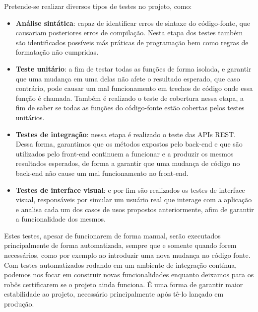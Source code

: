 Pretende-se realizar diversos tipos de testes no projeto, como:
\begin{itemize}
    \item \textbf{Análise sintática}: capaz de identificar erros de sintaxe do código-fonte, que causariam posteriores erros de compilação. Nesta etapa dos testes também são identificados possíveis más práticas de programação bem como regras de formatação não cumpridas.
    \item \textbf{Teste unitário}: a fim de testar todas as funções de forma isolada, e garantir que uma mudança em uma delas não afete o resultado esperado, que caso contrário, pode causar um mal funcionamento em trechos de código onde essa função é chamada. Também é realizado o teste de cobertura nessa etapa, a fim de saber se todas as funções do código-fonte estão cobertas pelos testes unitários.
    \item \textbf{Testes de integração}: nessa etapa é realizado o teste das APIs REST. Dessa forma, garantimos que os métodos expostos pelo back-end e que são utilizados pelo front-end continuem a funcionar e a produzir os mesmos resultados esperados, de forma a garantir que uma mudança de código no back-end não cause um mal funcionamento no front-end.
    \item \textbf{Testes de interface visual}: e por fim são realizados os testes de interface visual, responsáveis por simular um usuário real que interage com a aplicação e analisa cada um dos casos de usos propostos anteriormente, afim de garantir a funcionalidade dos mesmos.
\end{itemize}

Estes testes, apesar de funcionarem de forma manual, serão executados principalmente de forma automatizada, sempre que e somente quando forem necessários, como por exemplo ao introduzir uma nova mudança no código fonte. Com testes automatizados rodando em um ambiente de integração contínua, podemos nos focar em construir novas funcionalidades enquanto deixamos para os robôs certificarem se o projeto ainda funciona. É uma forma de garantir maior estabilidade ao projeto, necessário principalmente após tê-lo lançado em produção. 
